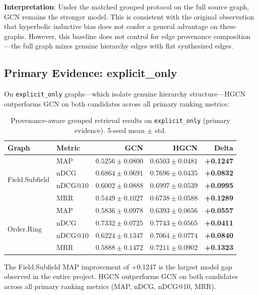\documentclass[runningheads]{llncs}
\begin{document}
\textbf{Interpretation}: Under the matched grouped protocol on the full source graph, GCN remains the stronger model. This is consistent with the original observation that hyperbolic inductive bias does not confer a general advantage on these graphs. However, this baseline does not control for edge provenance composition---the full graph mixes genuine hierarchy edges with flat synthesized edges.

\subsection{Primary Evidence: explicit\_only}

On \texttt{explicit\_only} graphs---which isolate genuine hierarchy structure---HGCN outperforms GCN on both candidates across all primary ranking metrics:

\begin{table}[h]
\centering
\caption{Provenance-aware grouped retrieval results on \texttt{explicit\_only} (primary evidence). 5-seed mean $\pm$ std.}
\label{tab:explicit}
\begin{tabular}{llrrr}
\toprule
Graph & Metric & GCN & HGCN & Delta \\
\midrule
\multirow{4}{*}{Field.Subfield}
& MAP     & $0.5256 \pm 0.0800$ & $0.6503 \pm 0.0481$ & \textbf{+0.1247} \\
& nDCG    & $0.6864 \pm 0.0691$ & $0.7696 \pm 0.0435$ & \textbf{+0.0832} \\
& nDCG@10 & $0.6002 \pm 0.0888$ & $0.6997 \pm 0.0539$ & \textbf{+0.0995} \\
& MRR     & $0.5449 \pm 0.1027$ & $0.6738 \pm 0.0588$ & \textbf{+0.1289} \\
\midrule
\multirow{4}{*}{Order.Ring}
& MAP     & $0.5836 \pm 0.0978$ & $0.6393 \pm 0.0656$ & \textbf{+0.0557} \\
& nDCG    & $0.7332 \pm 0.0725$ & $0.7743 \pm 0.0565$ & \textbf{+0.0411} \\
& nDCG@10 & $0.6224 \pm 0.1347$ & $0.7064 \pm 0.0774$ & \textbf{+0.0840} \\
& MRR     & $0.5888 \pm 0.1472$ & $0.7211 \pm 0.0902$ & \textbf{+0.1323} \\
\bottomrule
\end{tabular}
\end{table}

The Field.Subfield MAP improvement of +0.1247 is the largest model gap observed in the entire project. HGCN outperforms GCN on both candidates across all primary ranking metrics (MAP, nDCG, nDCG@10, MRR).
\end{document}
